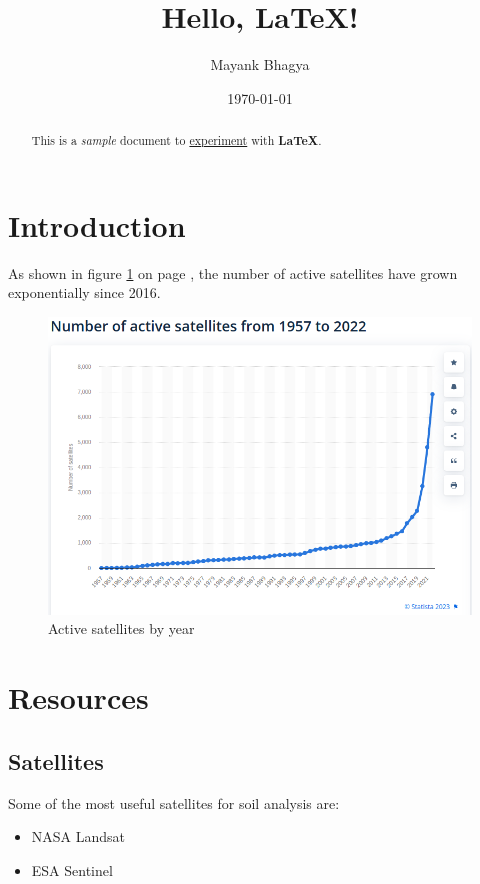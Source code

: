 \documentclass[10pt, twocolumn, a4paper]{article}
\title{Hello, \LaTeX!}
\author{Mayank Bhagya}
\date{\today}
\begin{document}
\maketitle %

\begin{abstract}  
  This is a \textit{sample} document to \underline{experiment} with \textbf{LaTeX}.
\end{abstract}
  
\section{Introduction}

As shown in figure \ref{fig:satcount} on page \pageref{fig:satcount}, the number of active satellites have grown exponentially since 2016.

\begin{figure}[h]
  \centering
  \includegraphics[width=\linewidth]{login}
  \caption{Active satellites by year}
  \label{fig:satcount}
\end{figure}

\section{Resources}

\subsection{Satellites}
Some of the most useful satellites for soil analysis are:
\begin{itemize}
  \item NASA Landsat
  \item ESA Sentinel
\end{itemize}
\end{document}
